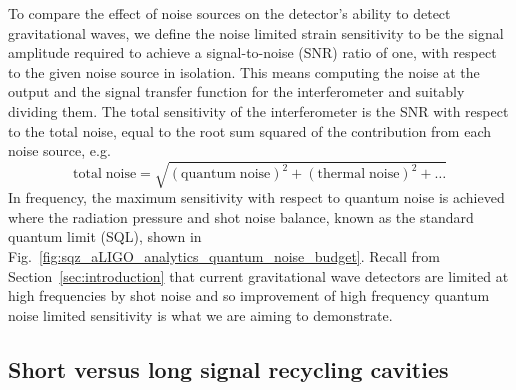 \documentclass[aps,pra,superscriptaddress,reprint,nofootinbib]{revtex4-1}
\begin{document}
To compare the effect of noise sources on the detector’s ability to detect gravitational waves, we define the noise limited strain sensitivity to be the signal amplitude required to achieve a signal-to-noise (SNR) ratio of one, with respect to the given noise source in isolation. This means computing the noise at the output and the signal transfer function for the interferometer and suitably dividing them. The total sensitivity of the interferometer is the SNR with respect to the total noise, equal to the root sum squared of the contribution from each noise source, e.g.\
\begin{equation}
\mathrm{total\; noise = \sqrt{(quantum \; noise)^2 + (thermal \; noise)^2 + \ldots}}
\end{equation}
In frequency, the maximum sensitivity with respect to quantum noise is achieved where the radiation pressure and shot noise balance, known as the standard quantum limit (SQL), shown in Fig.~\ref{fig:sqz_aLIGO_analytics_quantum_noise_budget}. Recall from Section~\ref{sec:introduction} that current gravitational wave detectors are limited at high frequencies by shot noise and so improvement of high frequency quantum noise limited sensitivity is what we are aiming to demonstrate.


\subsection{Short versus long signal recycling cavities}
\label{sec:long_srcs}
\end{document}
